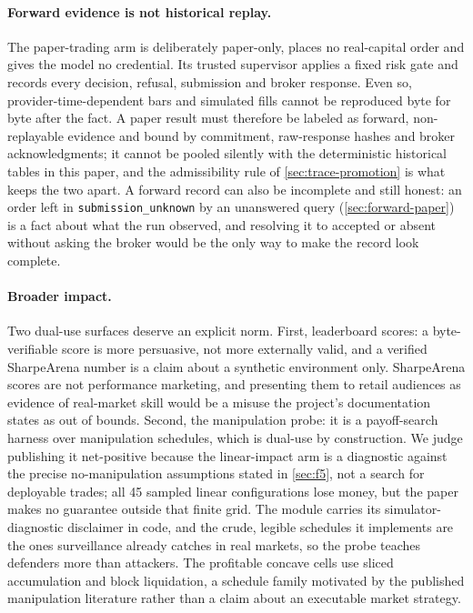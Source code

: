 \paragraph{Forward evidence is not historical replay.} The paper-trading arm is deliberately paper-only, places no real-capital order and gives the model no credential. Its trusted supervisor applies a fixed risk gate and records every decision, refusal, submission and broker response. Even so, provider-time-dependent bars and simulated fills cannot be reproduced byte for byte after the fact. A paper result must therefore be labeled as forward, non-replayable evidence and bound by commitment, raw-response hashes and broker acknowledgments; it cannot be pooled silently with the deterministic historical tables in this paper, and the admissibility rule of \cref{sec:trace-promotion} is what keeps the two apart. A forward record can also be incomplete and still honest: an order left in \texttt{submission\_unknown} by an unanswered query (\cref{sec:forward-paper}) is a fact about what the run observed, and resolving it to accepted or absent without asking the broker would be the only way to make the record look complete.

\paragraph{Broader impact.} Two dual-use surfaces deserve an explicit norm. First, leaderboard scores: a byte-verifiable score is more persuasive, not more externally valid, and a verified SharpeArena number is a claim about a synthetic environment only. SharpeArena scores are not performance marketing, and presenting them to retail audiences as evidence of real-market skill would be a misuse the project's documentation states as out of bounds. Second, the manipulation probe: it is a payoff-search harness over manipulation schedules, which is dual-use by construction. We judge publishing it net-positive because the linear-impact arm is a diagnostic against the precise no-manipulation assumptions stated in \cref{sec:f5}, not a search for deployable trades; all 45 sampled linear configurations lose money, but the paper makes no guarantee outside that finite grid. The module carries its simulator-diagnostic disclaimer in code, and the crude, legible schedules it implements are the ones surveillance already catches in real markets, so the probe teaches defenders more than attackers. The profitable concave cells use sliced accumulation and block liquidation, a schedule family motivated by the published manipulation literature rather than a claim about an executable market strategy.
